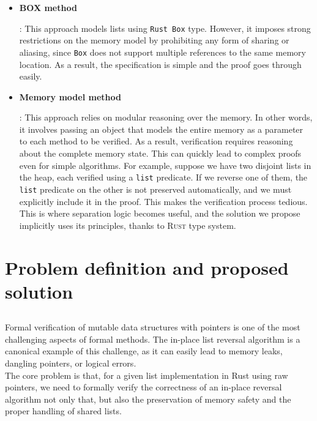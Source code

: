 \documentclass[11pt,a4paper]{article}
\begin{document}
\begin{itemize}
\item \hypertarget{BOXmeth}{\textbf{\textsc{BOX} method}}: This approach models lists using \texttt{Rust Box} type. However, it imposes strong restrictions on the memory model by prohibiting any form of sharing or aliasing, since \texttt{Box} does not support multiple references to the same memory location. As a result, the specification is simple and the proof goes through easily.
\item \hypertarget{MEMmodel}{\textbf{Memory model method}}: This approach relies on modular reasoning over the memory. In other words, it involves passing an object that models the entire memory as a parameter to each method to be verified. As a result, verification requires reasoning about the complete memory state. This can quickly lead to complex proofs even for simple algorithms. For example, suppose we have two disjoint lists in the heap, each verified using a \texttt{list} predicate. If we reverse one of them, the \texttt{list} predicate on the other is not preserved automatically, and we must explicitly include it in the proof. This makes the verification process tedious. This is where separation logic becomes useful, and the solution we propose implicitly uses its principles, thanks to \textsc{Rust} type system.
\end{itemize}

\section{Problem definition and proposed solution}
\subsection{}
Formal verification of mutable data structures with pointers is one of the most challenging aspects of formal methods. The in-place list reversal algorithm is a canonical example of this challenge, as it can easily lead to memory leaks, dangling pointers, or logical errors.\\
The core problem is that, for a given list implementation in Rust using raw pointers, we need to formally verify the correctness of an in-place reversal algorithm not only that, but also the preservation of memory safety and the proper handling of shared lists.

\subsection{}
\end{document}
